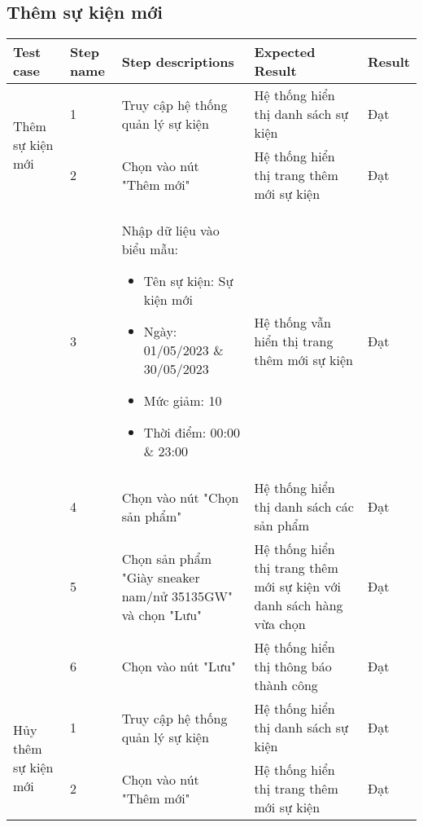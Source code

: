 \subsection{Thêm sự kiện mới}
{
    \setlength\extrarowheight{6pt}
    \begin{longtable}{| p{2.5cm}| p{1cm}| p{5.5cm}| p{4.5cm} | p{1.5cm} |}
        \hline
        \textbf{Test case} & \textbf{Step name} & \textbf{Step descriptions} & \textbf{Expected Result} & \textbf{Result} \\
        \hline
        \multirow[t]{2}{2.5cm}{Thêm sự kiện mới} & 1 & Truy cập hệ thống quản lý sự kiện & Hệ thống hiển thị danh sách sự kiện & Đạt \\
        \cline{2-5}
         & 2 & Chọn vào nút "Thêm mới" & Hệ thống hiển thị trang thêm mới sự kiện & Đạt \\
        \cline{2-5}
        & 3 & Nhập dữ liệu vào biểu mẫu:
        \begin{itemize}
            \item Tên sự kiện: Sự kiện mới
            \item Ngày: 01/05/2023 \& 30/05/2023
            \item Mức giảm: 10
            \item Thời điểm: 00:00 \& 23:00 
        \end{itemize} & Hệ thống vẫn hiển thị trang thêm mới sự kiện & Đạt \\
        \cline{2-5}
         & 4 & Chọn vào nút "Chọn sản phẩm" & Hệ thống hiển thị danh sách các sản phẩm & Đạt \\
         \cline{2-5}
         & 5 & Chọn sản phẩm "Giày sneaker nam/nử 35135GW" và chọn "Lưu" & Hệ thống hiển thị trang thêm mới sự kiện với danh sách hàng vừa chọn & Đạt \\
         \cline{2-5}
         & 6 & Chọn vào nút "Lưu" & Hệ thống hiển thị thông báo thành công & Đạt \\
        \hline
        \multirow[t]{2}{2.5cm}{Hủy thêm sự kiện mới} & 1 & Truy cập hệ thống quản lý sự kiện & Hệ thống hiển thị danh sách sự kiện & Đạt \\
        \cline{2-5}
         & 2 & Chọn vào nút "Thêm mới" & Hệ thống hiển thị trang thêm mới sự kiện & Đạt \\

\end{longtable}}
